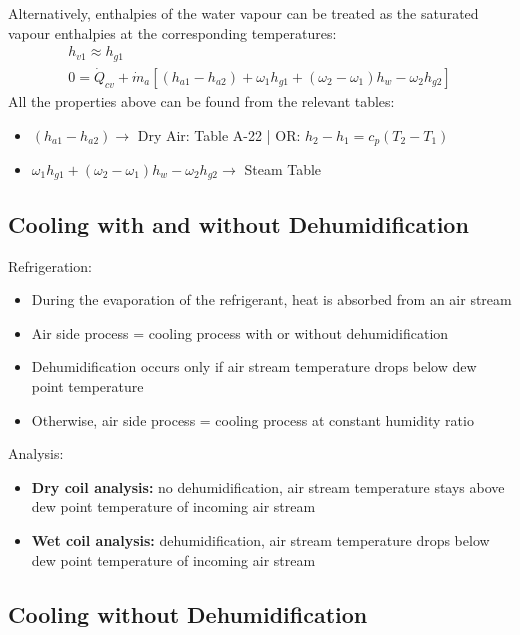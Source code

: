 Alternatively, enthalpies of the water vapour can be treated as the saturated vapour enthalpies at the corresponding temperatures:
\begin{gather}
  h_{v1} \approx h_{g1} \\[5pt]
  0 = \dot{Q}_{cv} + \dot{m}_{a}\left[(h_{a1} - h_{a2}) + \omega_1h_{g1} + (\omega_2-\omega_1)h_{w} - \omega_2h_{g2}\right]
\end{gather}
All the properties above can be found from the relevant tables:
\begin{itemize}
  \item $(h_{a1} - h_{a2}) \longrightarrow$ Dry Air: Table A-22 | OR: $h_2-h_1 = c_p(T_2-T_1)$
  \item $\omega_1h_{g1} + (\omega_2-\omega_1)h_{w} - \omega_2h_{g2} \longrightarrow$ Steam Table
\end{itemize}
\subsection{Cooling with and without Dehumidification}
Refrigeration:
\begin{itemize}[noitemsep]
  \item During the evaporation of the refrigerant, heat is absorbed from an air stream
  \item Air side process = cooling process with or without dehumidification
  \item Dehumidification occurs only if air stream temperature drops below dew point temperature
  \item Otherwise, air side process = cooling process at constant humidity ratio
\end{itemize}
Analysis:
\begin{itemize}[noitemsep]
  \item \textbf{Dry coil analysis:} no dehumidification, air stream temperature stays above dew point temperature of incoming air stream
  \item \textbf{Wet coil analysis:} dehumidification, air stream temperature drops below dew point temperature of incoming air stream
\end{itemize}

\subsection*{Cooling without Dehumidification}
